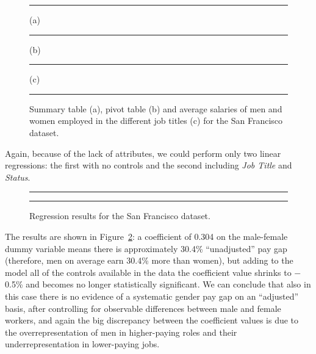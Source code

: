 \begin{figure}[t!]
\centering
\noindent\rule{\linewidth}{0.4pt}\par
\caption*{(a)}
\noindent\rule{\linewidth}{0.4pt}\par
\caption*{(b)}
\noindent\rule{\linewidth}{0.4pt}\par
\caption*{(c)}
\noindent\rule{\linewidth}{0.4pt}
\caption{Summary table (a), pivot table (b) and average salaries of men and women employed in the different job titles (c) for the San Francisco dataset.}
\label{fig:san_francisco_glassdoor1}
\end{figure}

Again, because of the lack of attributes, we could perform only two linear regressions: the first with no controls and the second including \textit{Job Title} and \textit{Status}.

\begin{figure}[t!]
\centering
\noindent\rule{\linewidth}{0.4pt}\par
\noindent\rule{\linewidth}{0.4pt}
\caption{Regression results for the San Francisco dataset.}
\label{fig:san_francisco_glassdoor2}
\end{figure}

The results are shown in Figure~\ref{fig:san_francisco_glassdoor2}: a coefficient of 0.304 on the male-female dummy variable means there is approximately 30.4\% ``unadjusted'' pay gap (therefore, men on average earn 30.4\% more than women), but adding to the model all of the controls available in the data the coefficient value shrinks to \(-\)0.5\% and becomes no longer statistically significant. We can conclude that also in this case there is no evidence of a systematic gender pay gap on an ``adjusted'' basis, after controlling for observable differences between male and female workers, and again the big discrepancy between the coefficient values is due to the overrepresentation of men in higher-paying roles and their underrepresentation in lower-paying jobs.


